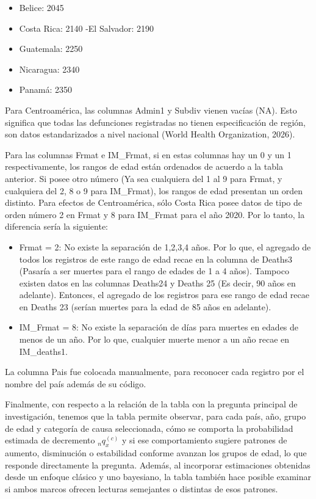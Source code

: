 \documentclass[
  letterpaper,
  DIV=11,
  numbers=noendperiod]{scrartcl}
\providecommand{\tightlist}{%
  \setlength{\itemsep}{0pt}\setlength{\parskip}{0pt}}\usepackage{longtable,booktabs,array}
\begin{document}
\begin{itemize}
\tightlist
\item
  Belice: 2045
\item
  Costa Rica: 2140 -El Salvador: 2190
\item
  Guatemala: 2250
\item
  Nicaragua: 2340
\item
  Panamá: 2350
\end{itemize}

Para Centroamérica, las columnas Admin1 y Subdiv vienen vacías (NA).
Esto significa que todas las defunciones registradas no tienen
especificación de región, son datos estandarizados a nivel nacional
(World Health Organization, 2026).

Para las columnas Frmat e IM\_Frmat, si en estas columnas hay un 0 y un
1 respectivamente, los rangos de edad están ordenados de acuerdo a la
tabla anterior. Si posee otro número (Ya sea cualquiera del 1 al 9 para
Frmat, y cualquiera del 2, 8 o 9 para IM\_Frmat), los rangos de edad
presentan un orden distinto. Para efectos de Centroamérica, sólo Costa
Rica posee datos de tipo de orden número 2 en Frmat y 8 para IM\_Frmat
para el año 2020. Por lo tanto, la diferencia sería la siguiente:

\begin{itemize}
\item
  Frmat = 2: No existe la separación de 1,2,3,4 años. Por lo que, el
  agregado de todos los registros de este rango de edad recae en la
  columna de Deaths3 (Pasaría a ser muertes para el rango de edades de 1
  a 4 años). Tampoco existen datos en las columnas Deaths24 y Deaths 25
  (Es decir, 90 años en adelante). Entonces, el agregado de los
  registros para ese rango de edad recae en Deaths 23 (serían muertes
  para la edad de 85 años en adelante).
\item
  IM\_Frmat = 8: No existe la separación de días para muertes en edades
  de menos de un año. Por lo que, cualquier muerte menor a un año recae
  en IM\_deaths1.
\end{itemize}

La columna Pais fue colocada manualmente, para reconocer cada registro
por el nombre del país además de su código.

Finalmente, con respecto a la relación de la tabla con la pregunta
principal de investigación, tenemos que la tabla permite observar, para
cada país, año, grupo de edad y categoría de causa seleccionada, cómo se
comporta la probabilidad estimada de decremento \({}_{n}q_{x}^{(c)}\) y
si ese comportamiento sugiere patrones de aumento, disminución o
estabilidad conforme avanzan los grupos de edad, lo que responde
directamente la pregunta. Además, al incorporar estimaciones obtenidas
desde un enfoque clásico y uno bayesiano, la tabla también hace posible
examinar si ambos marcos ofrecen lecturas semejantes o distintas de esos
patrones.
\end{document}
